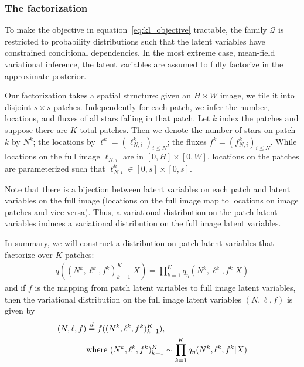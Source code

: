 \subsubsection{The factorization}
To make the objective in equation~\ref{eq:kl_objective} tractable, 
the family $\mathcal{Q}$ is restricted to probability distributions 
such that the latent variables have constrained conditional dependencies. In the most extreme case, mean-field variational inference, the latent variables are assumed to fully factorize in the approximate posterior. 

Our factorization takes a spatial structure: given an $H \times W$ image, 
we tile it into disjoint $s \times s$ patches. Independently for each patch, 
we infer the number, locations, and fluxes of all stars falling in that patch.
Let $k$ index the patches and suppose there are $K$ total patches. Then we
denote the number of stars on patch $k$ by $N^k$;
the locations 
by $\ell^k = (\ell_{N, i}^k)_{i \leq N}$; 
the fluxes $f^k = (f_{N, i}^k)_{i \leq N}$. While locations on the 
full image $\ell_{N, i}$ are in $[0, H] \times [0, W]$, 
locations on the patches are parameterized such that 
$\ell^k_{N, i}\in[0, s] \times [0, s]$.

Note that there is a bijection between latent variables on each patch and latent variables on the full image (locations on the full image map to locations on image patches and vice-versa). Thus, a variational distribution on the patch 
latent variables induces a variational distribution on the full image
latent variables. 

In summary, we will construct a distribution on patch latent variables that factorize over $K$ patches: 
\begin{align}
    q((N^k, \ell^k, f^k)_{k = 1}^K|X) = \prod_{k = 1}^K q_\eta(N^k, \ell^k, f^k | X)
\end{align}
and if $f$ is the mapping from patch latent variables to full image latent variables, then the variational distribution on the full image latent variables
$(N, \ell, f)$ is given by 
\begin{align}
    (N, \ell, f) &\stackrel{d}{=} f((N^k, \ell^k, f^k)_{k = 1}^K), \notag \\  
        &\text{where } (N^k, \ell^k, f^k)_{k = 1}^K \sim \prod_{k = 1}^K q_\eta(N^k, \ell^k, f^k | X)
\end{align}

